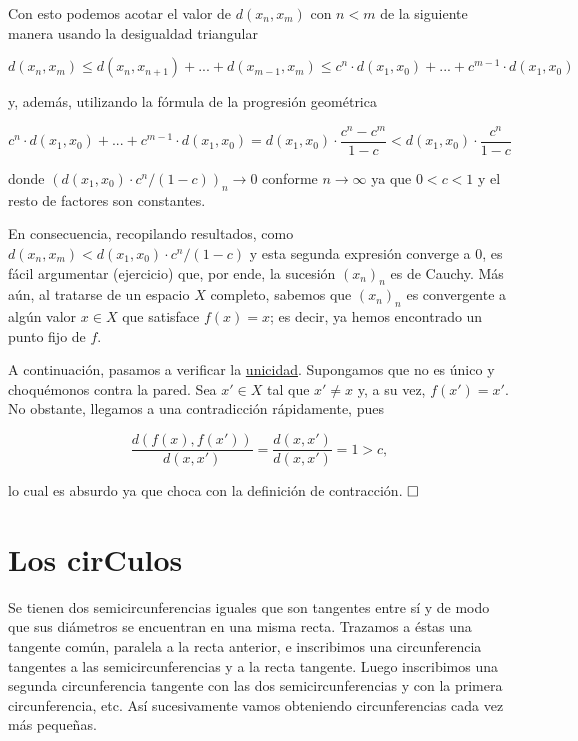 \documentclass{article}
\begin{document}
Con esto podemos acotar el valor de $d(x_n, x_m)$ con $n < m$ de la siguiente manera usando la desigualdad triangular

\[d(x_n, x_m) \leq d(x_n, x_{n+1}) + ... + d(x_{m-1}, x_m) \leq c^n \cdot d(x_1, x_0) + ... + c^{m-1} \cdot d(x_1, x_0)\]

\noindent y, además, utilizando la fórmula de la progresión geométrica

\[c^n \cdot d(x_1, x_0) + ... + c^{m-1} \cdot d(x_1, x_0) = d(x_1, x_0) \cdot \frac{c^n - c^m}{1 - c} < d(x_1, x_0) \cdot \frac{c^n}{1 - c}\]

\noindent donde $(d(x_1, x_0) \cdot c^n/(1 - c))_n \to 0$ conforme $n \to \infty$ ya que $0 < c < 1$ y el resto de factores son constantes. 

En consecuencia, recopilando resultados, como $d(x_n, x_m) < d(x_1, x_0) \cdot c^n/(1 - c)$ y esta segunda expresión converge a 0, es fácil argumentar (ejercicio) que, por ende, la sucesión $(x_n)_n$ es de Cauchy. Más aún, al tratarse de un espacio $X$ completo, sabemos que $(x_n)_n$ es convergente a algún valor $x \in X$ que satisface $f(x) = x$; es decir, ya hemos encontrado un punto fijo de $f$.

A continuación, pasamos a verificar la \underline{unicidad}. Supongamos que no es único y choquémonos contra la pared. Sea $x' \in X$ tal que $x' \neq x$ y, a su vez, $f(x') = x'$. No obstante, llegamos a una contradicción rápidamente, pues

\[\frac{d(f(x), f(x'))}{d(x, x')} = \frac{d(x, x')}{d(x, x')} = 1 > c,\]

\noindent lo cual es absurdo ya que choca con la definición de contracción. $\hfill\square$

\newpage

\section{Los cirCulos}

Se tienen dos semicircunferencias iguales que son tangentes entre sí y de modo que sus diámetros se encuentran en una misma recta. Trazamos a éstas una tangente común, paralela a la recta anterior, e inscribimos una circunferencia tangentes a las semicircunferencias y a la recta tangente. Luego inscribimos una segunda circunferencia tangente con las dos semicircunferencias y con la primera circunferencia, etc. Así sucesivamente vamos obteniendo circunferencias cada vez más pequeñas. \\
\end{document}
